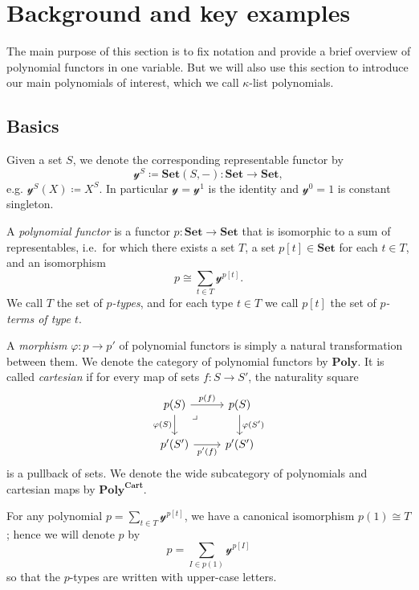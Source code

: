\documentclass[11pt, one side, article]{memoir}
\theoremstyle{definition}
\theoremstyle{plain}
\newenvironment{definition}
  {\pushQED{\qed}\renewcommand{\qedsymbol}{$\lozenge$}\definitionx}
  {\popQED\enddefinitionx}
\newcommand{\Cat}[1]{\mathbf{#1}}%
\newcommand{\smset}{\Cat{Set}}
\newcommand{\yon}{\mathcal{y}}
\newcommand{\poly}{\Cat{Poly}}
\newcommand{\polycart}{\poly^{\Cat{Cart}}}
\newcommand{\0}{\textsf{0}}
\newcommand{\1}{\tn{\textsf{1}}}
\begin{document}
\chapter{Background and key examples}

The main purpose of this section is to fix notation and provide a brief overview of polynomial functors in one variable. But we will also use this section to introduce our main polynomials of interest, which we call $\kappa$-list polynomials.

\section{Basics}

\begin{definition}[Polynomial functor]\label{def.poly}
Given a set $S$, we denote the corresponding representable functor by
\[\yon^S\coloneqq\smset(S,-)\colon\smset\to\smset,\]
e.g. $\yon^S(X)\coloneqq X^S$. In particular $\yon=\yon^1$ is the identity and $\yon^0=1$ is constant singleton.

A \emph{polynomial functor} is a functor $p\colon\smset\to\smset$ that is isomorphic to a sum of representables, i.e.\ for which there exists a set $T$, a set $p[t]\in\smset$ for each $t\in T$, and an isomorphism
\[
p\cong\sum_{t\in T}\yon^{p[t]}.
\]
We call $T$ the set of \emph{$p$-types}, and for each type $t\in T$ we call $p[t]$ the set of \emph{$p$-terms of type $t$}. 

A \emph{morphism} $\varphi\colon p\to p'$ of polynomial functors is simply a natural transformation between them. We denote the category of polynomial functors by $\poly$. It is called \emph{cartesian} if for every map of sets $f\colon S\to S'$, the naturality square
\[
\begin{tikzcd}
  p(S)\ar[r, "p(f)"]\ar[d, "\varphi(S)"']&p(S)\ar[d, "\varphi(S')"]\\
  p'(S')\ar[r, "p'(f)"']&p'(S')\ar[ul, phantom, very near end, "\lrcorner"]
\end{tikzcd}
\]
is a pullback of sets. We denote the wide subcategory of polynomials and cartesian maps by $\polycart$.
\end{definition}

For any polynomial $p=\sum_{t\in T}\yon^{p[t]}$, we have a canonical isomorphism $p(1)\cong T$; hence we will denote $p$ by
\begin{equation}\label{eqn.poly_notation}
p=\sum_{I\in p(1)}\yon^{p[I]}
\end{equation}
so that the $p$-types are written with upper-case letters.
\end{document}

